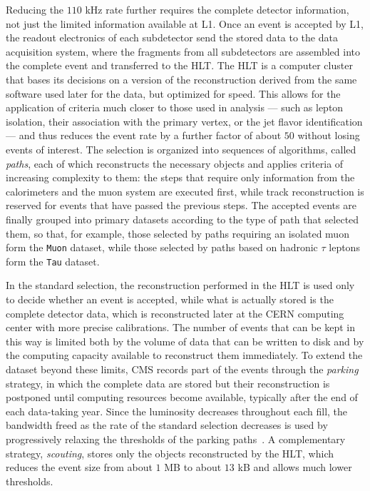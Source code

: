 Reducing the $110$ kHz rate further requires the complete detector information, not just the limited information available at L1. Once an event is accepted by L1, the readout electronics of each subdetector send the stored data to the data acquisition system, where the fragments from all subdetectors are assembled into the complete event and transferred to the HLT. The HLT is a computer cluster that bases its decisions on a version of the reconstruction derived from the same software used later for the data, but optimized for speed. This allows for the application of criteria much closer to those used in analysis — such as lepton isolation, their association with the primary vertex, or the jet flavor identification — and thus reduces the event rate by a further factor of about $50$ without losing events of interest. The selection is organized into sequences of algorithms, called \textit{paths}, each of which reconstructs the necessary objects and applies criteria of increasing complexity to them: the steps that require only information from the calorimeters and the muon system are executed first, while track reconstruction is reserved for events that have passed the previous steps. The accepted events are finally grouped into primary datasets according to the type of path that selected them, so that, for example, those selected by paths requiring an isolated muon form the \texttt{Muon} dataset, while those selected by paths based on hadronic $\tau$ leptons form the \texttt{Tau} dataset.

In the standard selection, the reconstruction performed in the HLT is used only to decide whether an event is accepted, while what is actually stored is the complete detector data, which is reconstructed later at the CERN computing center with more precise calibrations. The number of events that can be kept in this way is limited both by the volume of data that can be written to disk and by the computing capacity available to reconstruct them immediately. To extend the dataset beyond these limits, CMS records part of the events through the \textit{parking} strategy, in which the complete data are stored but their reconstruction is postponed until computing resources become available, typically after the end of each data-taking year. Since the luminosity decreases throughout each fill, the bandwidth freed as the rate of the standard selection decreases is used by progressively relaxing the thresholds of the parking paths~\cite{CMS:2023gfb}. A complementary strategy, \textit{scouting}, stores only the objects reconstructed by the HLT, which reduces the event size from about $1$ MB to about $13$ kB and allows much lower thresholds.\medskip

